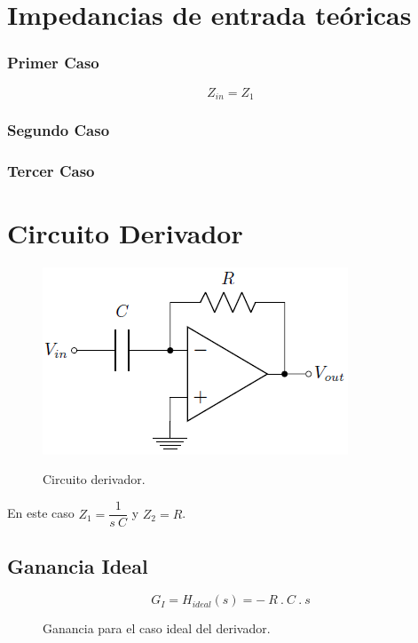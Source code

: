 \documentclass[11pt, a4paper]{article}
\begin{document}
\section{Impedancias de entrada teóricas}
\subsubsection{Primer Caso}
\begin{equation}
	Z_{in}=Z_1
\end{equation}
\subsubsection{Segundo Caso}

\subsubsection{Tercer Caso}

\section{Circuito Derivador}

\begin{figure}[h!]
\centering
\includegraphics[scale=0.5]{circuitoderivador.png}
\label{circuitoderivador}
\caption{Circuito derivador.}
\end{figure}
En este caso $Z_1=\dfrac{1}{s \ C}$ y $Z_2= R$.

\subsection{Ganancia Ideal}

\begin{equation}
G_I=H_{ideal}(s)= - \ R \ . \ C \ . \ s
\end{equation}


\begin{center}
	\begin{figure}[h!]	
	\label{avolidealderivador}
	\caption{Ganancia para el caso ideal del derivador.}
	\end{figure}
\end{center}
\end{document}
